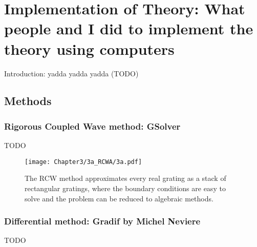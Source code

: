 \chapter{Implementation of Theory: What people and I did to implement the theory using computers}

Introduction: yadda yadda yadda (TODO)
\section{Methods}
\subsection{Rigorous Coupled Wave method: GSolver}
TODO

\begin{figure}[htbp] %
   \centering
   \texttt{[image: Chapter3/3a\_RCWA/3a.pdf]} 
   \caption{The RCW method approximates every real grating as a stack of rectangular gratings, where the boundary conditions are easy to solve and the problem can be reduced to algebraic methods.}
   \label{3a}
\end{figure}

\subsection{Differential method: Gradif by Michel Neviere}
TODO


